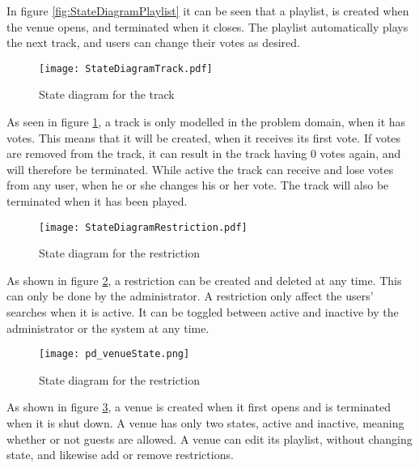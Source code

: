 In figure \cref{fig:StateDiagramPlaylist} it can be seen that a playlist, is created when the venue opens, and terminated when it closes. The playlist automatically plays the next track, and users can change their votes as desired.

\begin{figure}[H]
  \centering
  \texttt{[image: StateDiagramTrack.pdf]}
  \caption{State diagram for the track}\label{fig:StateDiagramTrack}
\end{figure}

As seen in figure \cref{fig:StateDiagramTrack}, a track is only modelled in the problem domain, when it has votes. This means that it will be created, when it receives its first vote. If votes are removed from the track, it can result in the track having 0 votes again, and will therefore be terminated. While active the track can receive and lose votes from any user, when he or she changes his or her vote. The track will also be terminated when it has been played.

\begin{figure}[H]
  \centering
  \texttt{[image: StateDiagramRestriction.pdf]}
  \caption{State diagram for the restriction}\label{fig:StateDiagramRestriction}
\end{figure}

As shown in figure \cref{fig:StateDiagramRestriction}, a restriction can be created and deleted at any time. This can only be done by the administrator. A restriction only affect the users' searches when it is active. It can be toggled between active and inactive by the administrator or the system at any time.

\begin{figure}[H]
  \centering
  \texttt{[image: pd\_venueState.png]}
  \caption{State diagram for the restriction}\label{fig:StateDiagramVenue}
\end{figure}

As shown in figure \cref{fig:StateDiagramVenue}, a venue is created when it first opens and is terminated when it is shut down. A venue has only two states, active and inactive, meaning whether or not guests are allowed. A venue can edit its playlist, without changing state, and likewise add or remove restrictions.
